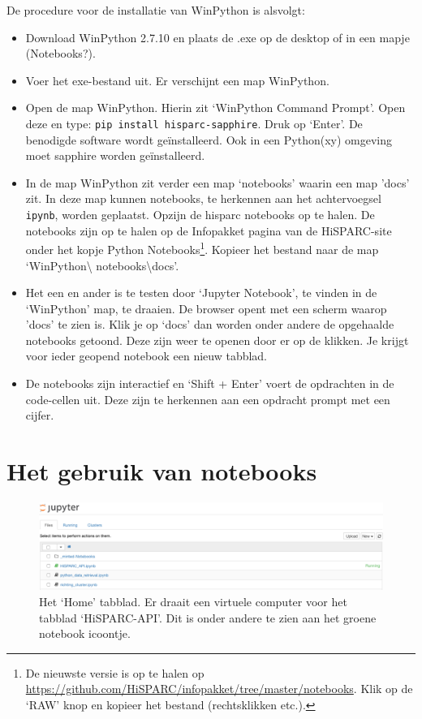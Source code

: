 De procedure voor de installatie van WinPython is alsvolgt:
\begin{itemize}
\item Download WinPython 2.7.10 en plaats de .exe op de desktop of in een mapje (Notebooks?).
\item Voer het exe-bestand uit. Er verschijnt een map WinPython.
\item Open de map WinPython. Hierin zit `WinPython Command Prompt'. Open deze en type:
 {\tt pip install hisparc-sapphire}. Druk op `Enter'. De benodigde \hisparc software wordt ge\"{i}nstalleerd.
 Ook in een Python(xy) omgeving moet sapphire worden ge\"{i}nstalleerd.
\item In de map WinPython zit verder een map `notebooks' waarin een map 'docs' zit. In deze map kunnen notebooks,
te herkennen aan het achtervoegsel {\tt ipynb}, worden geplaatst.
Opzijn de hisparc notebooks op te halen. De notebooks 
zijn op te halen op de Infopakket pagina van de HiSPARC-site onder het kopje Python Notebooks\footnote{De nieuwste 
versie is op te halen op \url{https://github.com/HiSPARC/infopakket/tree/master/notebooks}. Klik
op de `RAW' knop en kopieer het bestand (rechtsklikken etc.).}. Kopieer het bestand naar de map `WinPython\textbackslash
notebooks\textbackslash docs'.
\item Het een en ander is te testen door `Jupyter Notebook', te vinden in de `WinPython' map, te draaien. De browser
opent met een scherm waarop 'docs' te zien is. Klik je op `docs' dan worden onder andere de opgehaalde notebooks
getoond. Deze zijn weer te openen door er op de klikken. Je krijgt voor ieder geopend notebook een nieuw tabblad.
\item De notebooks zijn interactief en `Shift + Enter' voert de opdrachten in de code-cellen uit. Deze zijn te herkennen aan
een opdracht prompt met een cijfer.
\end{itemize}

\section{Het gebruik van notebooks}

\begin{figure}[H]
\includegraphics[width=16cm]{home.png}
\caption{Het `Home' tabblad. Er draait een virtuele computer voor het tabblad `HiSPARC-API'. Dit is onder andere te zien
aan het groene notebook icoontje.}
\end{figure}

